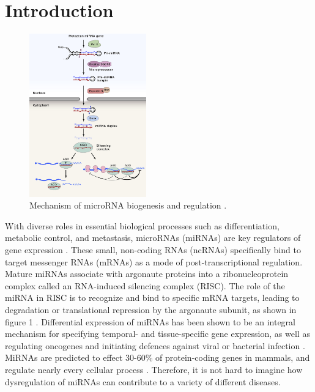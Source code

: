 \documentclass[12pt]{article}
\begin{document}
\section{   Introduction}

\begin{figure}
\centering
\includegraphics[width=0.45\textwidth]{figures/gr1_lrg.jpg}
\caption[microRNA Mechanisms]{Mechanism of microRNA biogenesis and regulation \cite{bartel2018metazoan}.}
\label{1}
\end{figure}

With diverse roles in essential biological processes such as differentiation, metabolic control, and metastasis, microRNAs (miRNAs) are key regulators of gene expression \cite{bartel2009micrornas, christopher2016microrna}. These small, non-coding RNAs (ncRNAs) specifically bind to target messenger RNAs (mRNAs) as a mode of post-transcriptional regulation. Mature miRNAs associate with argonaute proteins into a ribonucleoprotein complex called an RNA-induced silencing complex (RISC). The role of the miRNA in RISC is to recognize and bind to specific mRNA targets, leading to degradation or translational repression by the argonaute subunit, as shown in figure 1 \cite{filipowicz2008mechanisms, bartel2018metazoan}. Differential expression of miRNAs has been shown to be an integral mechanism for specifying temporal- and tissue-specific gene expression, as well as regulating oncogenes and initiating defences against viral or bacterial infection \cite{farh2005widespread, allison2012fundamental, andreassen2017mirnas}. MiRNAs are predicted to effect 30-60\% of protein-coding genes in mammals, and regulate nearly every cellular process \cite{andreassen2017mirnas, filipowicz2008mechanisms}. Therefore, it is not hard to imagine how dysregulation of miRNAs can contribute to a variety of different diseases.
\end{document}

